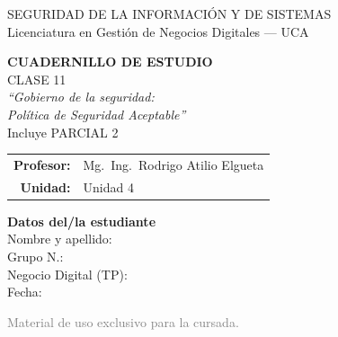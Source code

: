 \documentclass[12pt,a4paper]{article}
\begin{document}
\begin{titlepage}
\centering
\vspace*{1cm}

\begin{cajaTitulo}[width=\textwidth, halign=center]
  SEGURIDAD DE LA INFORMACI\'ON Y DE SISTEMAS\\[4pt]
  {\large Licenciatura en Gesti\'on de Negocios Digitales --- UCA}
\end{cajaTitulo}

\vspace{1.2cm}

{\Huge\bfseries\color{azulUCA} CUADERNILLO DE ESTUDIO}\\[8pt]
{\LARGE\color{doradoUCA} CLASE 11}\\[10pt]
{\Large\itshape ``Gobierno de la seguridad:\\[2pt] Pol\'itica de Seguridad Aceptable''}\\[6pt]
{\large\color{violetaParcial}\; Incluye PARCIAL 2}\\[1.5cm]

\begin{tabular}{rl}
\textbf{Profesor:}   & Mg.\ Ing.\ Rodrigo Atilio Elgueta \\[4pt]
\textbf{Unidad:}     & Unidad 4 \\[4pt]
\end{tabular}

\vfill

\begin{tcolorbox}[colback=grisClaro, colframe=azulUCA, arc=3mm, width=0.9\textwidth]
  \centering
  {\bfseries Datos del/la estudiante}\\[10pt]
  Nombre y apellido: \underline{\hspace{5cm}}\\[10pt]
  Grupo N.\textdegree: \underline{\hspace{5cm}}\\[10pt]
  Negocio Digital (TP): \underline{\hspace{5cm}}\\[10pt]
  Fecha: \underline{\hspace{5cm}}
\end{tcolorbox}

\vspace{1cm}
{\small\textcolor{gray}{Material de uso exclusivo para la cursada.}}
\end{titlepage}
\end{document}
